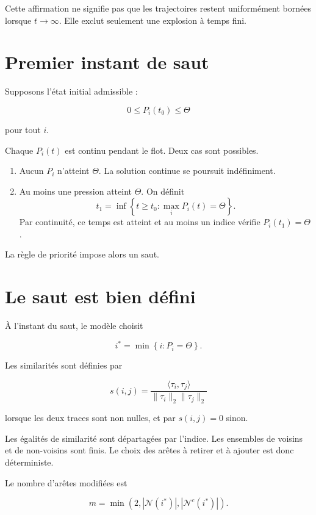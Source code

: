 Cette affirmation ne signifie pas que les trajectoires restent
uniformément bornées lorsque \(t\to\infty\). Elle exclut seulement une
explosion à temps fini.

\section{Premier instant de saut}
\label{annexe-existence-premier-saut}

Supposons l'état initial admissible :

\[
0\leq P_i(t_0)\leq\Theta
\]

pour tout \(i\).

Chaque \(P_i(t)\) est continu pendant le flot. Deux cas sont possibles.

\begin{enumerate}
\item
  Aucun \(P_i\) n'atteint \(\Theta\). La solution continue se poursuit
  indéfiniment.
\item
  Au moins une pression atteint \(\Theta\). On définit
  \[
  t_1
  =
  \inf\left\{
  t\geq t_0:
  \max_iP_i(t)=\Theta
  \right\}.
  \]
  Par continuité, ce temps est atteint et au moins un indice vérifie
  \(P_i(t_1)=\Theta\).
\end{enumerate}

La règle de priorité impose alors un saut.

\section{Le saut est bien défini}
\label{annexe-existence-saut-bien-defini}

À l'instant du saut, le modèle choisit

\[
i^\ast
=
\min\left\{
i:
P_i=\Theta
\right\}.
\]

Les similarités sont définies par

\[
s(i,j)
=
\frac{\langle\tau_i,\tau_j\rangle}
{\|\tau_i\|_2\|\tau_j\|_2}
\]

lorsque les deux traces sont non nulles, et par \(s(i,j)=0\) sinon.

Les égalités de similarité sont départagées par l'indice. Les ensembles
de voisins et de non-voisins sont finis. Le choix des arêtes à retirer
et à ajouter est donc déterministe.

Le nombre d'arêtes modifiées est

\[
m
=
\min\left(
2,
|\mathcal N(i^\ast)|,
|\mathcal N^c(i^\ast)|
\right).
\]


